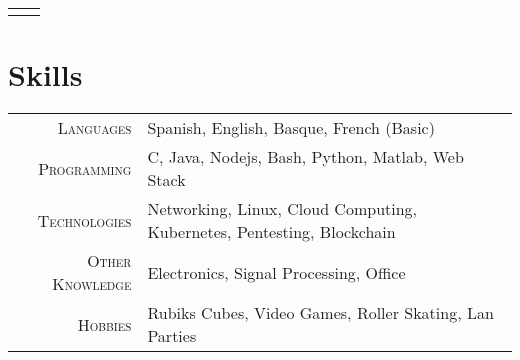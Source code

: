 \documentclass[a4paper,10pt]{article}
\begin{document}
\begin{tabular}{rp{13.3cm}}
\vspace{-.2in}
\end{tabular}


 \section{Skills}
\begin{tabular}{r|l}
\textsc{Languages} & Spanish, English, Basque, French (Basic) \\
\textsc{Programming} & C, Java, Nodejs, Bash, Python, Matlab, Web Stack \\
\textsc{Technologies} & Networking, Linux, Cloud Computing, Kubernetes, Pentesting, Blockchain  \\
\textsc{Other Knowledge} & Electronics, Signal Processing, Office \\
\textsc{Hobbies} & Rubiks Cubes, Video Games, Roller Skating, Lan Parties
\end{tabular}

\end{document}
